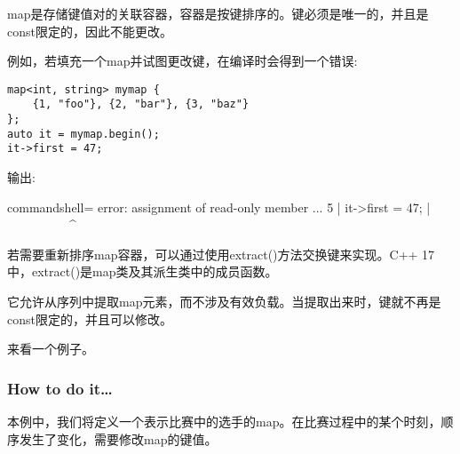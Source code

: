 
map是存储键值对的关联容器，容器是按键排序的。键必须是唯一的，并且是const限定的，因此不能更改。

例如，若填充一个map并试图更改键，在编译时会得到一个错误:

\begin{lstlisting}[style=styleCXX]
map<int, string> mymap {
	{1, "foo"}, {2, "bar"}, {3, "baz"}
};
auto it = mymap.begin();
it->first = 47;
\end{lstlisting}

输出:

\begin{tcblisting}{commandshell={}}
error: assignment of read-only member ...
5 | it->first = 47;
  |  ~~~~~~~~~~^~~~
\end{tcblisting}

若需要重新排序map容器，可以通过使用extract()方法交换键来实现。C++ 17中，extract()是map类及其派生类中的成员函数。

它允许从序列中提取map元素，而不涉及有效负载。当提取出来时，键就不再是const限定的，并且可以修改。

来看一个例子。

\subsubsection{How to do it…}

本例中，我们将定义一个表示比赛中的选手的map。在比赛过程中的某个时刻，顺序发生了变化，需要修改map的键值。

